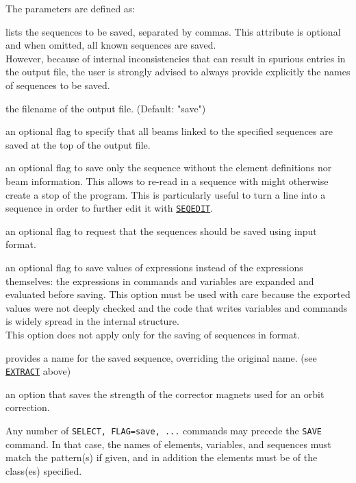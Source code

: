The parameters are defined as: 
\begin{madlist}
	 lists the sequences to be saved, separated by commas. 
	This attribute is optional and when omitted, all known 
	sequences are saved. \\
	However, because of internal inconsistencies that can result in spurious 
	entries in the output file, the user is strongly advised to always provide 
	explicitly the names of sequences to be saved.

	 the filename of the output file. (Default: "save")

	 an optional flag to specify that all beams linked to the
	specified sequences are saved at the top of the output file.

	 an optional flag to save only the sequence without the
	element definitions nor beam information. This allows to re-read in a
	sequence with might otherwise create a stop of the program. This is
	particularly useful to turn a line into a sequence in order to further edit 
	it with \hyperref[sec:seqedit]{\texttt{SEQEDIT}}.

	 an optional flag to request that the sequences should be  
	saved using \madeight input format.

	 an optional flag to save values of expressions 
	instead of the expressions themselves: the expressions in commands 
	and variables are expanded and evaluated before saving.
	This option must be used with care because the exported values were not deeply
	checked and the code that writes variables and commands is widely spread
	in the internal structure. \\
	This option does not apply only for the saving of sequences in \madeight format. 

	 provides a name for the saved sequence, overriding the 
	original name. (see \hyperref[sec:extract]{\texttt{EXTRACT}} above)
  
   an option that saves the strength of the corrector magnets used
  for an orbit correction.
\end{madlist}

Any number of \texttt{SELECT, FLAG=save, ...} commands may precede
the \texttt{SAVE} command. In that case, the names of elements, variables, and
sequences must match the pattern(s) if given, and in addition the
elements must be of the class(es) specified. 


